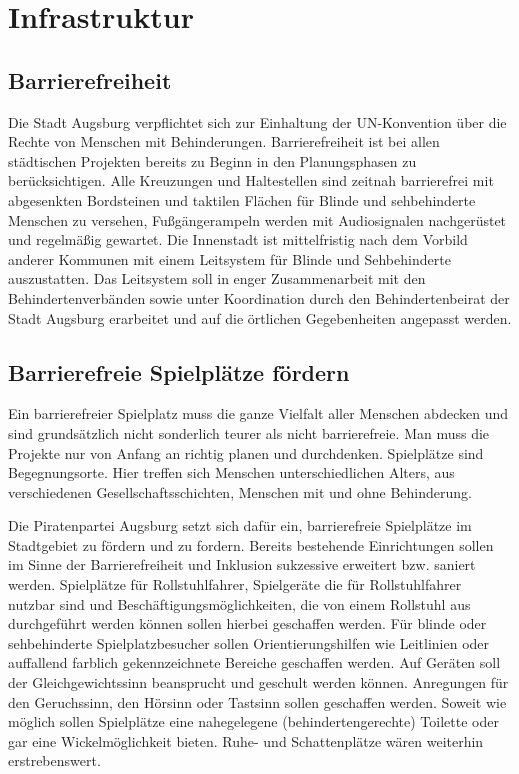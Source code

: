 \chapter{Infrastruktur}

  \section{Barrierefreiheit}
  
  Die Stadt Augsburg verpflichtet sich zur Einhaltung der UN-Konvention über 
  die Rechte von Menschen mit Behinderungen. Barrierefreiheit ist bei allen 
  städtischen Projekten bereits zu Beginn in den Planungsphasen zu 
  berücksichtigen. Alle Kreuzungen und Haltestellen sind zeitnah barrierefrei 
  mit abgesenkten Bordsteinen und taktilen Flächen für Blinde und 
  sehbehinderte Menschen zu versehen, Fußgängerampeln werden mit Audiosignalen 
  nachgerüstet und regelmäßig gewartet. Die Innenstadt ist mittelfristig nach 
  dem Vorbild anderer Kommunen mit einem Leitsystem für Blinde und 
  Sehbehinderte auszustatten. Das Leitsystem soll in enger Zusammenarbeit mit 
  den Behindertenverbänden sowie unter Koordination durch den 
  Behindertenbeirat der Stadt Augsburg erarbeitet und auf die örtlichen 
  Gegebenheiten angepasst werden.
  
  \section{Barrierefreie Spielplätze fördern}
  
  Ein barrierefreier Spielplatz muss die ganze Vielfalt aller Menschen 
  abdecken und sind grundsätzlich nicht sonderlich teurer als nicht 
  barrierefreie. Man muss die Projekte nur von Anfang an richtig planen und 
  durchdenken. Spielplätze sind Begegnungsorte. Hier treffen sich Menschen 
  unterschiedlichen Alters, aus verschiedenen Gesellschaftsschichten, Menschen 
  mit und ohne Behinderung.
    
  Die Piratenpartei Augsburg setzt sich dafür ein, barrierefreie Spielplätze 
  im Stadtgebiet zu fördern und zu fordern. Bereits bestehende Einrichtungen 
  sollen im Sinne der Barrierefreiheit und Inklusion sukzessive erweitert bzw. 
  saniert werden. Spielplätze für Rollstuhlfahrer, Spielgeräte die für 
  Rollstuhlfahrer nutzbar sind und Beschäftigungsmöglichkeiten, die von einem 
  Rollstuhl aus durchgeführt werden können sollen hierbei geschaffen werden. 
  Für blinde oder sehbehinderte Spielplatzbesucher sollen Orientierungshilfen 
  wie Leitlinien oder auffallend farblich gekennzeichnete Bereiche geschaffen 
  werden. Auf Geräten soll der Gleichgewichtssinn beansprucht und geschult 
  werden können. Anregungen für den Geruchssinn, den Hörsinn oder Tastsinn 
  sollen geschaffen werden. Soweit wie möglich sollen Spielplätze eine 
  nahegelegene (behindertengerechte) Toilette oder gar eine Wickelmöglichkeit 
  bieten. Ruhe- und Schattenplätze wären weiterhin erstrebenswert.
  
